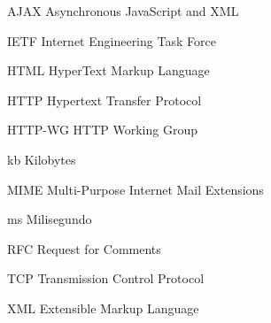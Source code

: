 %
%

\begin{siglas}
	\item[AJAX] Asynchronous JavaScript and XML
	\item[IETF] Internet Engineering Task Force
    \item[HTML] HyperText Markup Language
    \item[HTTP] Hypertext Transfer Protocol
    \item[HTTP-WG] HTTP Working Group
    \item[kb] Kilobytes
    \item[MIME] Multi-Purpose Internet Mail Extensions
    \item[ms] Milisegundo
    \item[RFC] Request for Comments
    \item[TCP] Transmission Control Protocol
    \item[XML] Extensible Markup Language
\end{siglas}
